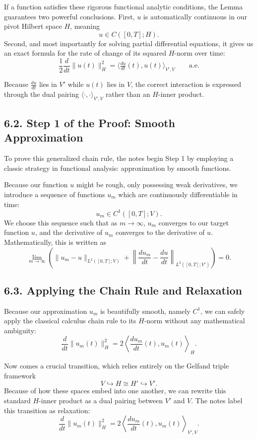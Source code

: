 \documentclass[11pt]{article}
\theoremstyle{definition}
\theoremstyle{remark}
\begin{document}
If a function satisfies these rigorous functional analytic conditions, the Lemma guarantees two powerful conclusions. First, \(u\) is automatically continuous in our pivot Hilbert space \(H\), meaning
\[
u\in C([0,T];H).
\]
Second, and most importantly for solving partial differential equations, it gives us an exact formula for the rate of change of its squared \(H\)-norm over time:
\[
\frac12\frac{d}{dt}\|u(t)\|_H^2
=
\langle \tfrac{du}{dt}(t),u(t)\rangle_{V',V}
\qquad \text{a.e.}
\]

Because \(\frac{du}{dt}\) lies in \(V'\) while \(u(t)\) lies in \(V\), the correct interaction is expressed through the dual pairing \(\langle\cdot,\cdot\rangle_{V',V}\) rather than an \(H\)-inner product.

\subsection*{6.2. Step 1 of the Proof: Smooth Approximation}
To prove this generalized chain rule, the notes begin Step 1 by employing a classic strategy in functional analysis: approximation by smooth functions.

Because our function \(u\) might be rough, only possessing weak derivatives, we introduce a sequence of functions \(u_m\) which are continuously differentiable in time:
\[
u_m\in C^1([0,T];V).
\]
We choose this sequence such that as \(m\to\infty\), \(u_m\) converges to our target function \(u\), and the derivative of \(u_m\) converges to the derivative of \(u\). Mathematically, this is written as
\[
\lim_{m\to\infty}
\left(
\|u_m-u\|_{L^2([0,T];V)}
+
\left\|
\frac{du_m}{dt}-\frac{du}{dt}
\right\|_{L^2([0,T];V')}
\right)
=0.
\]

\subsection*{6.3. Applying the Chain Rule and Relaxation}
Because our approximation \(u_m\) is beautifully smooth, namely \(C^1\), we can safely apply the classical calculus chain rule to its \(H\)-norm without any mathematical ambiguity:
\[
\frac{d}{dt}\|u_m(t)\|_H^2
=
2\left\langle \frac{du_m}{dt}(t),u_m(t)\right\rangle_H.
\]

Now comes a crucial transition, which relies entirely on the Gelfand triple framework
\[
V\hookrightarrow H\cong H'\hookrightarrow V'.
\]
Because of how these spaces embed into one another, we can rewrite this standard \(H\)-inner product as a dual pairing between \(V'\) and \(V\). The notes label this transition as relaxation:
\[
\frac{d}{dt}\|u_m(t)\|_H^2
=
2\left\langle \frac{du_m}{dt}(t),u_m(t)\right\rangle_{V',V}.
\]
\end{document}
